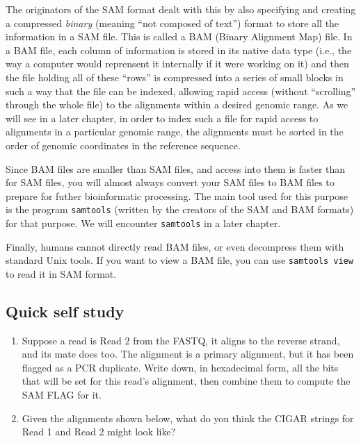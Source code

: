 \documentclass[]{krantz}
\providecommand{\tightlist}{%
  \setlength{\itemsep}{0pt}\setlength{\parskip}{0pt}}
\begin{document}
The originators of the SAM format dealt with this by also specifying and creating
a compressed \emph{binary} (meaning ``not composed of text'') format to store all the
information in a SAM file. This is called a BAM (Binary Alignment Map) file. In a
BAM file, each column of information is stored in its native data type (i.e., the way a
computer would reprensent it internally if it were working on it) and then the file holding all
of these ``rows'' is compressed into a series of small blocks in such a way that the file can be
indexed, allowing rapid
access (without ``scrolling'' through the whole file) to the alignments within
a desired genomic range. As we will see in a later chapter,
in order to index such a file for rapid
access to alignments in a particular genomic range, the alignments must be sorted
in the order of genomic coordinates in the reference sequence.

Since BAM files are smaller than SAM files, and access into them
is faster than for SAM files, you will almost always convert your SAM files to BAM
files to prepare for futher bioinformatic processing. The main tool
used for this purpose is the program \texttt{samtools}
(written by the creators of the SAM and BAM formats)
for that purpose. We will encounter \texttt{samtools} in a later chapter.

Finally, humans cannot directly read BAM files, or even decompress them with
standard Unix tools. If you want to view a BAM file, you can use
\texttt{samtools\ view} to read it in SAM format.

\hypertarget{quick-self-study}{%
\subsection{Quick self study}\label{quick-self-study}}

\begin{enumerate}
\def\labelenumi{\arabic{enumi}.}
\tightlist
\item
  Suppose a read is Read 2 from the FASTQ, it aligns to the reverse strand, and its mate does
  too. The alignment is a primary alignment, but it has been flagged as a PCR duplicate. Write
  down, in hexadecimal form, all the bits that will be set for this read's alignment, then
  combine them to compute the SAM FLAG for it.
\item
  Given the alignments shown below, what do you think the CIGAR strings for Read 1 and Read 2
  might look like?
\end{enumerate}
\end{document}
